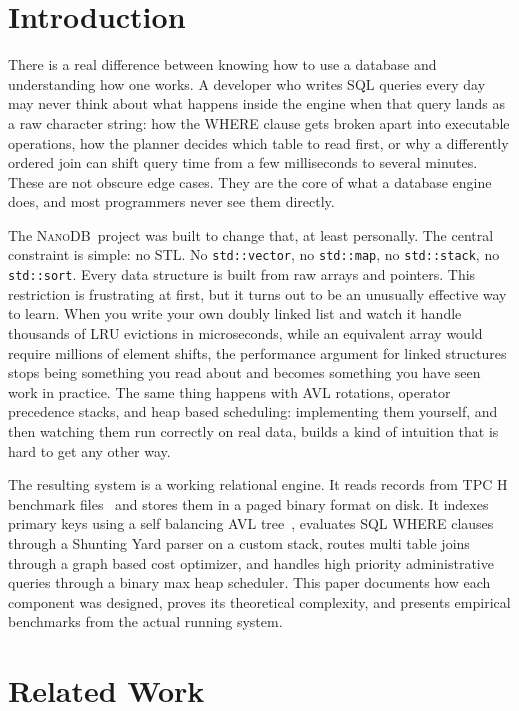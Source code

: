 \documentclass[conference]{IEEEtran}
\newcommand{\NanoDB}{\textsc{NanoDB}}
\newcommand{\code}[1]{\texttt{#1}}
\begin{document}
\section{Introduction}

There is a real difference between knowing how to use a database and
understanding how one works. A developer who writes SQL queries every day may
never think about what happens inside the engine when that query lands as a raw
character string: how the WHERE clause gets broken apart into executable
operations, how the planner decides which table to read first, or why a
differently ordered join can shift query time from a few milliseconds to several
minutes. These are not obscure edge cases. They are the core of what a database
engine does, and most programmers never see them directly.

The \NanoDB\ project was built to change that, at least personally. The central
constraint is simple: no STL. No \code{std::vector}, no \code{std::map}, no
\code{std::stack}, no \code{std::sort}. Every data structure is built from raw
arrays and pointers. This restriction is frustrating at first, but it turns out
to be an unusually effective way to learn. When you write your own doubly linked
list and watch it handle thousands of LRU evictions in microseconds, while an
equivalent array would require millions of element shifts, the performance
argument for linked structures stops being something you read about and becomes
something you have seen work in practice. The same thing happens with AVL
rotations, operator precedence stacks, and heap based scheduling: implementing
them yourself, and then watching them run correctly on real data, builds a kind
of intuition that is hard to get any other way.

The resulting system is a working relational engine. It reads records from TPC H
benchmark files~\cite{tpch2023} and stores them in a paged binary format on
disk. It indexes primary keys using a self balancing AVL tree~\cite{cormen2022},
evaluates SQL WHERE clauses through a Shunting Yard parser on a custom stack,
routes multi table joins through a graph based cost optimizer, and handles
high priority administrative queries through a binary max heap scheduler. This
paper documents how each component was designed, proves its theoretical
complexity, and presents empirical benchmarks from the actual running system.

\section{Related Work}
\end{document}
